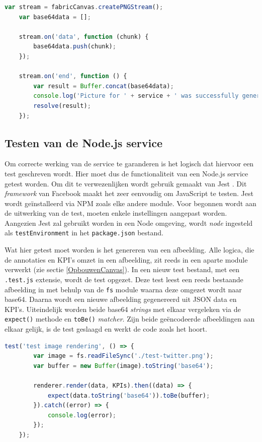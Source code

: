 \begin{lstlisting}[caption={renderer.js - aanmaken van base64},label=lst:Base64Generation,language=javascript]
	var stream = fabricCanvas.createPNGStream();
	var base64data = [];
	
	stream.on('data', function (chunk) {
		base64data.push(chunk);
	});
	
	stream.on('end', function () {
		var result = Buffer.concat(base64data);
		console.log('Picture for ' + service + ' was successfully generated');
		resolve(result);
	});
\end{lstlisting}

\subsection{Testen van de Node.js service}
Om correcte werking van de service te garanderen is het logisch dat hiervoor een test geschreven wordt. Hier moet dus de functionaliteit van een Node.js service getest worden. Om dit te verwezenlijken wordt gebruik gemaakt van Jest \cite{JestGettingStarted}. Dit \textit{framework} van Facebook maakt het zeer eenvoudig om JavaScript te testen. Jest wordt ge\"{i}nstalleerd via NPM zoals elke andere module. Voor begonnen wordt aan de uitwerking van de test, moeten enkele instellingen aangepast worden. Aangezien Jest zal gebruikt worden in een Node omgeving, wordt \textit{node} ingesteld als \texttt{testEnvironment} in het \texttt{package.json} bestand. 

Wat hier getest moet worden is het genereren van een afbeelding. Alle logica, die de annotaties en KPI's omzet in een afbeelding, zit reeds in een aparte module verwerkt (zie sectie \ref{OpbouwenCanvas}). In een nieuw test bestand, met een \texttt{.test.js} extensie, wordt de test opgezet. Deze test leest een reeds bestaande afbeelding in met behulp van de \texttt{fs} module waarna deze omgezet wordt naar base64. Daarna wordt een nieuwe afbeelding gegenereerd uit JSON data en KPI's. Uiteindelijk worden beide base64 \textit{strings} met elkaar vergeleken via de \texttt{expect()} methode en \texttt{toBe()} \textit{matcher}. Zijn beide ge\"{e}ncodeerde afbeeldingen aan elkaar gelijk, is de test geslaagd en werkt de code zoals het hoort. 

\begin{lstlisting}[caption={render.test.js - Testen van de service},label=lst:RenderTest,language=javascript]
	test('test image rendering', () => {
		var image = fs.readFileSync('./test-twitter.png');
		var buffer = new Buffer(image).toString('base64');
		
		renderer.render(data, KPIs).then((data) => {
			expect(data.toString('base64')).toBe(buffer);
		}).catch((error) => {
			console.log(error);
		});
	});
\end{lstlisting}

